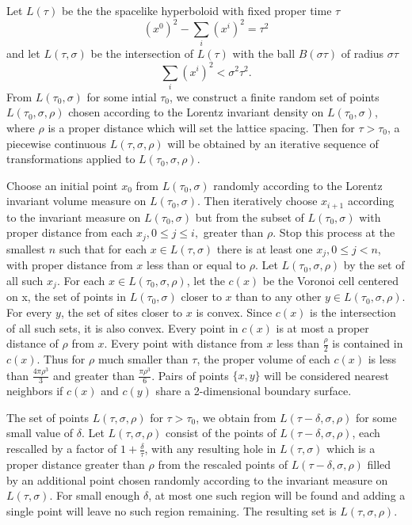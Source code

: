 \documentclass[12pt,amsmath,amssymb,onecolumn]{revtex4-2}
\begin{document}
Let $L(\tau)$ be the the spacelike hyperboloid with fixed proper time $\tau$
\begin{equation}
\label{hyperboloid}
(x^0)^2 - \sum_i (x^i)^ 2 =  \tau^2
\end{equation}
and let $L(\tau, \sigma)$ be
the intersection of $L(\tau)$ with the ball $B( \sigma \tau)$ of radius $\sigma \tau$
\begin{equation}
\label{sphere}
\sum_i (x^i)^2 <  \sigma^2 \tau^2.
\end{equation}
From $L(\tau_0, \sigma)$ for some intial $\tau_0$,
we construct a finite random set of points
$L( \tau_0, \sigma, \rho)$ chosen according to
the Lorentz invariant density on $L(\tau_0, \sigma)$,
where $\rho$ is a proper distance which will
set the lattice spacing.
Then for $\tau > \tau_0$, a piecewise continuous
$L( \tau, \sigma, \rho)$ 
will be obtained by an iterative sequence
of transformations applied to $L( \tau_0, \sigma, \rho)$.

Choose an initial point $x_0$ from $L(\tau_0, \sigma)$ randomly
according to 
the Lorentz invariant volume measure on $L(\tau_0, \sigma)$.
Then iteratively choose $x_{i+1}$
according to the invariant measure on $L(\tau_0, \sigma)$ but from the subset of $L(\tau_0, \sigma)$ with
proper distance from each $x_j, 0 \le j \le i,$ greater than $\rho$. Stop this process at the smallest $n$
such that for each $x \in L( \tau, \sigma)$ there is at least one $x_j, 0 \le j < n$, 
with proper distance from $x$ less than or equal to $\rho$. Let $L( \tau_0, \sigma, \rho)$ by the set
of all such $x_j$.
For each $x \in L( \tau_0, \sigma, \rho)$, let the $c(x)$ be the
Voronoi cell centered on x,
the set of points in $L(\tau_0, \sigma)$
closer to $x$ than to any other $y \in L( \tau_0, \sigma, \rho)$.
For every $y$, the set of sites closer to $x$ is convex. Since $c(x)$ is the intersection of
all such sets, it is also convex.
Every point in $c(x)$ is
at most a proper distance of $\rho$ from $x$. Every point with distance from $x$ less than
$\frac{\rho}{2}$ is contained in $c(x)$. Thus for $\rho$ much smaller than
$\tau$, the proper volume of
each $c(x)$ is less than $\frac{4 \pi \rho^3}{3}$ and greater than $\frac{\pi \rho^3}{6}$.
Pairs of points $\{x, y\}$ will
be considered nearest neighbors if $c(x)$ and $c(y)$ share a 2-dimensional boundary surface.

The set of points $L( \tau, \sigma, \rho)$ for $\tau > \tau_0$, we obtain from
$L( \tau - \delta, \sigma, \rho)$ for some small value of $\delta$.
Let $L( \tau, \sigma, \rho)$ consist of the points
of $L( \tau - \delta, \sigma, \rho)$,
each rescalled by a factor of $1 + \frac{\delta}{\tau}$,
with any resulting hole in $L(\tau, \sigma)$ 
which is a proper distance greater than $\rho$
from the rescaled points of $L( \tau - \delta, \sigma, \rho)$
filled by an additional
point chosen randomly according to the invariant measure on $L(\tau, \sigma)$.
For small enough $\delta$, at most one such region will be found and adding a
single point will leave no such region remaining. The resulting set is
$L(\tau, \sigma, \rho)$. 
\end{document}
